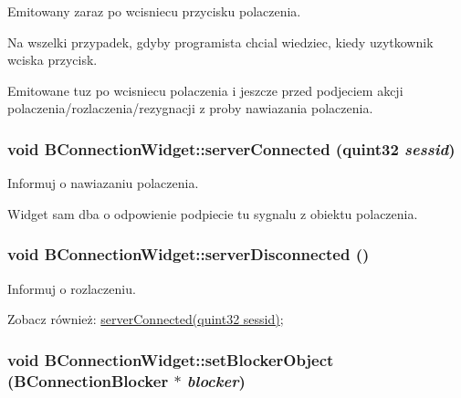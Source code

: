 Emitowany zaraz po wcisniecu przycisku polaczenia. 

Na wszelki przypadek, gdyby programista chcial wiedziec, kiedy uzytkownik wciska przycisk.

Emitowane tuz po wcisniecu polaczenia i jeszcze przed podjeciem akcji polaczenia/rozlaczenia/rezygnacji z proby nawiazania polaczenia. \hypertarget{class_b_connection_widget_7c9d3a266939c6719fe198f9b3d67636}{
\subsubsection[{serverConnected}]{\setlength{\rightskip}{0pt plus 5cm}void BConnectionWidget::serverConnected (quint32 {\em sessid})}}
\label{class_b_connection_widget_7c9d3a266939c6719fe198f9b3d67636}


Informuj o nawiazaniu polaczenia. 

Widget sam dba o odpowienie podpiecie tu sygnalu z obiektu polaczenia. \hypertarget{class_b_connection_widget_159829b06e46c68a354ec999d4b15b61}{
\subsubsection[{serverDisconnected}]{\setlength{\rightskip}{0pt plus 5cm}void BConnectionWidget::serverDisconnected ()}}
\label{class_b_connection_widget_159829b06e46c68a354ec999d4b15b61}


Informuj o rozlaczeniu. 

\begin{Desc}
\item[Zobacz również:]\hyperlink{class_b_connection_widget_7c9d3a266939c6719fe198f9b3d67636}{serverConnected(quint32 sessid)}; \end{Desc}
\hypertarget{class_b_connection_widget_976657d9910495a76d16b7c90d0b54fc}{
\subsubsection[{setBlockerObject}]{\setlength{\rightskip}{0pt plus 5cm}void BConnectionWidget::setBlockerObject ({\bf BConnectionBlocker} $\ast$ {\em blocker})}}
\label{class_b_connection_widget_976657d9910495a76d16b7c90d0b54fc}


